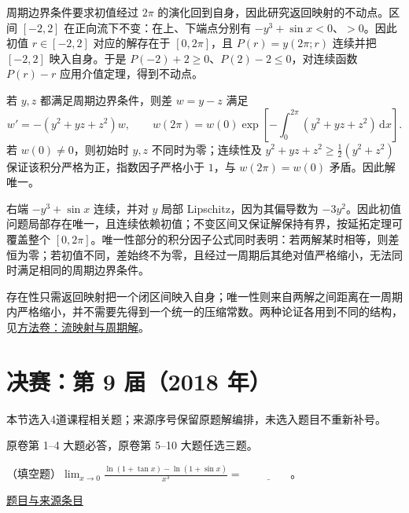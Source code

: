 \documentclass[12pt,fontset=fandol]{ctexart}
\begin{document}
\begin{solve}\label{ans:fin08-lo:9}

周期边界条件要求初值经过 $2\pi$ 的演化回到自身，因此研究返回映射的不动点。区间 $[-2,2]$ 在正向流下不变：在上、下端点分别有 $-y^3+\sin x<0$、$>0$。因此初值 $r\in[-2,2]$ 对应的解存在于 $[0,2\pi]$，且 $P(r)=y(2\pi;r)$ 连续并把 $[-2,2]$ 映入自身。于是 $P(-2)+2\geq0$、$P(2)-2\leq0$，对连续函数 $P(r)-r$ 应用介值定理，得到不动点。

若 $y,z$ 都满足周期边界条件，则差 $w=y-z$ 满足
\[
w'=-(y^2+yz+z^2)w,\qquad
w(2\pi)=w(0)\exp\left[-\int_0^{2\pi}(y^2+yz+z^2)\,\mathrm dx\right].
\]
若 $w(0)\ne0$，则初始时 $y,z$ 不同时为零；连续性及 $y^2+yz+z^2\geq\frac12(y^2+z^2)$ 保证该积分严格为正，指数因子严格小于 $1$，与 $w(2\pi)=w(0)$ 矛盾。因此解唯一。

右端 $-y^3+\sin x$ 连续，并对 $y$ 局部 Lipschitz，因为其偏导数为 $-3y^2$。因此初值问题局部存在唯一，且连续依赖初值；不变区间又保证解保持有界，按延拓定理可覆盖整个 $[0,2\pi]$。唯一性部分的积分因子公式同时表明：若两解某时相等，则差恒为零；若初值不同，差始终不为零，且经过一周期后其绝对值严格缩小，无法同时满足相同的周期边界条件。

\end{solve}

\begin{remark}[方法与条件]存在性只需返回映射把一个闭区间映入自身；唯一性则来自两解之间距离在一周期内严格缩小，并不需要先得到一个统一的压缩常数。两种论证各用到不同的结构，见\hyperref[app:dynamics-flow]{方法卷：流映射与周期解}。\end{remark}

\section{决赛：第 9 届（2018 年）}

本节选入4道课程相关题；来源序号保留原题解编排，未选入题目不重新补号。

\begin{remark}[来源说明]原卷第 1--4 大题必答，原卷第 5--10 大题任选三题。\end{remark}

\begin{example}[来源序号2]\label{ex:fin09-hi:2}\label{pr:fin09-hi:2}

（填空题）$\lim_{x \to 0} \frac{\ln(1+\tan x)-\ln(1+\sin x)}{x^{3}}=$ $\underline{\qquad\qquad}$。

\par\href{https://github.com/lzxcr/cmc-mathematics/blob/64916fa1fdbc3e444a652eca204d5669058ee321/src/problems/finals/09/02.md}{题目与来源条目}

\end{example}
\end{document}
